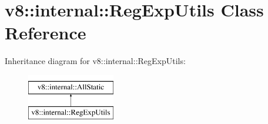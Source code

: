 \hypertarget{classv8_1_1internal_1_1RegExpUtils}{}\section{v8\+:\+:internal\+:\+:Reg\+Exp\+Utils Class Reference}
\label{classv8_1_1internal_1_1RegExpUtils}
Inheritance diagram for v8\+:\+:internal\+:\+:Reg\+Exp\+Utils\+:\begin{figure}[H]
\begin{center}
\leavevmode
\includegraphics[height=2.000000cm]{classv8_1_1internal_1_1RegExpUtils}
\end{center}
\end{figure}
